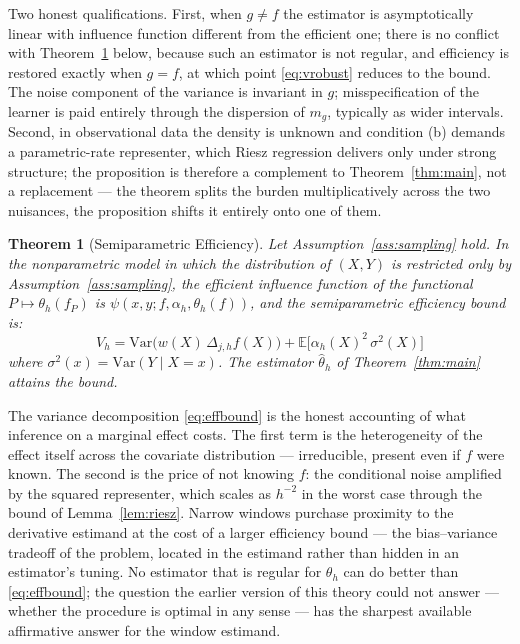 \documentclass[12pt]{article}
\newtheorem{theorem}{Theorem}
\newcommand{\E}{\mathbb{E}}
\newcommand{\Dh}{\Delta_{j,h}}
\begin{document}
	Two honest qualifications. First, when $g \neq f$ the estimator is asymptotically
	linear with influence function different from the efficient one; there is no
	conflict with Theorem~\ref{thm:efficiency} below, because such an estimator is
	not regular, and efficiency is restored exactly when $g = f$, at which point
	\eqref{eq:vrobust} reduces to the bound. The noise component of the variance is
	invariant in $g$; misspecification of the learner is paid entirely through the
	dispersion of $m_g$, typically as wider intervals. Second, in observational data
	the density is unknown and condition (b) demands a parametric-rate representer,
	which Riesz regression delivers only under strong structure; the proposition is
	therefore a complement to Theorem~\ref{thm:main}, not a replacement --- the
	theorem splits the burden multiplicatively across the two nuisances, the
	proposition shifts it entirely onto one of them.
	
	\begin{theorem}[Semiparametric Efficiency]
		\label{thm:efficiency}
		Let Assumption~\ref{ass:sampling} hold. In the nonparametric model in which the
		distribution of $(X, Y)$ is restricted only by
		Assumption~\ref{ass:sampling}, the efficient influence function of the
		functional $P \mapsto \theta_h(f_P)$ is
		$\psi(x, y; f, \alpha_h, \theta_h(f))$, and the semiparametric efficiency
		bound is:
		\begin{equation}
			V_h = \mathrm{Var}\bigl(w(X)\, \Dh f(X)\bigr)
			+ \E\bigl[\alpha_h(X)^2\, \sigma^2(X)\bigr]
			\label{eq:effbound}
		\end{equation}
		where $\sigma^2(x) = \mathrm{Var}(Y \mid X = x)$. The estimator
		$\hat{\theta}_h$ of Theorem~\ref{thm:main} attains the bound.
	\end{theorem}
	
	The variance decomposition \eqref{eq:effbound} is the honest accounting of what
	inference on a marginal effect costs. The first term is the heterogeneity of the
	effect itself across the covariate distribution --- irreducible, present even if
	$f$ were known. The second is the price of not knowing $f$: the conditional noise
	amplified by the squared representer, which scales as $h^{-2}$ in the worst case
	through the bound of Lemma~\ref{lem:riesz}. Narrow windows purchase proximity to
	the derivative estimand at the cost of a larger efficiency bound --- the
	bias--variance tradeoff of the problem, located in the estimand rather than hidden
	in an estimator's tuning. No estimator that is regular for $\theta_h$ can do better
	than \eqref{eq:effbound}; the question the earlier version of this theory could not
	answer --- whether the procedure is optimal in any sense --- has the sharpest
	available affirmative answer for the window estimand.
	
\end{document}
